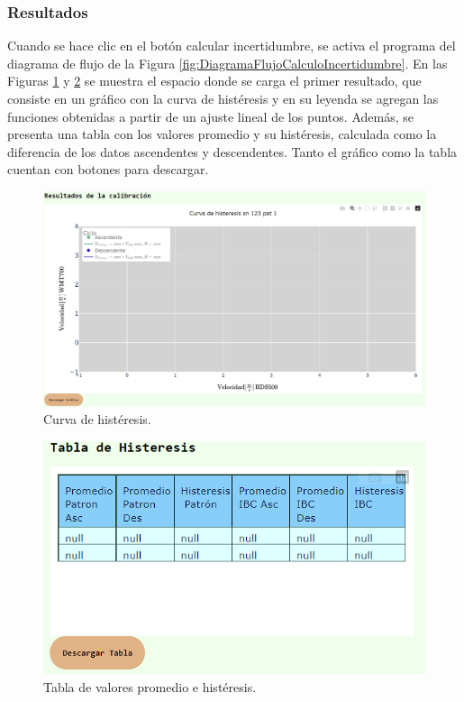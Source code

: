 \subsubsection{Resultados}\label{sec:Resultados}

Cuando se hace clic en el botón calcular incertidumbre, se activa el programa del diagrama de flujo de la Figura \ref{fig:DiagramaFlujoCalculoIncertidumbre}. En las Figuras \ref{fig:curvaHisteris} y \ref{fig:tablaHisteresis} se muestra el espacio donde se carga el primer resultado, que consiste en un gráfico con la curva de histéresis y en su leyenda se agregan las funciones obtenidas a partir de un ajuste lineal de los puntos. Además, se presenta una tabla con los valores promedio y su histéresis, calculada como la diferencia de los datos ascendentes y descendentes. Tanto el gráfico como la tabla cuentan con botones para descargar.

\begin{figure}[H]
    \centering
    \includegraphics[width=0.9\linewidth]{Figuras/AplicacionWeb/frondend/curvaHisteris.png}
    \caption{Curva de histéresis.}
    \label{fig:curvaHisteris}
\end{figure}

\begin{figure}[H]
    \centering
    \includegraphics[width=0.6\linewidth]{Figuras/AplicacionWeb/frondend/tablaHisteresis.png}
    \caption{Tabla de valores promedio e histéresis.}
    \label{fig:tablaHisteresis}
\end{figure}


